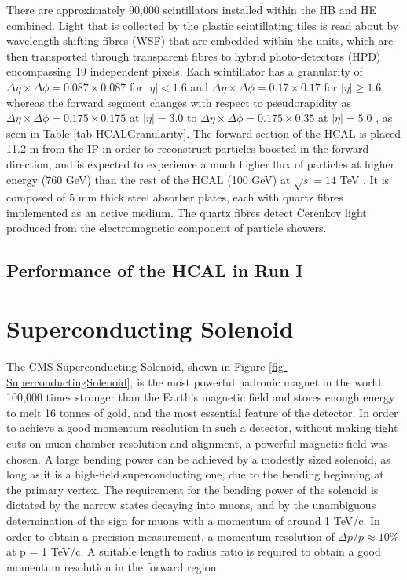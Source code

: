 There are approximately 90,000 scintillators installed within the HB and HE combined. Light that is collected by the plastic scintillating tiles is read about by wavelength-shifting fibres (WSF) that are embedded within the units, which are then transported through transparent fibres to hybrid photo-detectors (HPD) encompassing 19 independent pixels. Each scintillator has a granularity of $\Delta \eta \times \Delta \phi = 0.087 \times 0.087$ for $|\eta|<1.6$ and $\Delta \eta \times \Delta \phi = 0.17 \times 0.17$ for $|\eta| \ge 1.6$, whereas the forward segment changes with respect to pseudorapidity as $\Delta \eta \times \Delta \phi = 0.175 \times 0.175$ at $|\eta| = 3.0$ to $\Delta \eta \times \Delta \phi = 0.175 \times 0.35$ at $|\eta| = 5.0$ \cite{HCALTdr}, as seen in Table \ref{tab-HCALGranularity}. The forward section of the HCAL is placed 11.2 m from the IP in order to reconstruct particles boosted in the forward direction, and is expected to experience a much higher flux of particles at higher energy (760 GeV) than the rest of the HCAL (100 GeV) at $\sqrt{s}=14$ TeV \cite{HCALUpgradeTdr}. It is composed of 5 mm thick steel absorber plates, each with quartz fibres implemented as an active medium. The quartz fibres detect \v{C}erenkov light produced from the electromagnetic component of particle showers.

\subsection{Performance of the HCAL in Run I}   



\section{Superconducting Solenoid} \label{sec-SuperconductingSolenoid}

The CMS Superconducting Solenoid, shown in Figure \ref{fig-SuperconductingSolenoid}, is the most powerful hadronic magnet in the world, 100,000 times stronger than the Earth's magnetic field and stores enough energy to melt 16 tonnes of gold, and the most essential feature of the detector. In order to achieve a good momentum resolution in such a detector, without making tight cuts on muon chamber resolution and alignment, a powerful magnetic field was chosen. A large bending power can be achieved by a modestly sized solenoid, as long as it is a high-field superconducting one, due to the bending beginning at the primary vertex. The requirement for the bending power of the solenoid is dictated by the narrow states decaying into muons, and by the unambiguous determination of the sign for muons with a momentum of around 1 TeV/c. In order to obtain a precision measurement, a momentum resolution of $\Delta p/p\approx10\%$ at p = 1 TeV/c. A suitable length to radius ratio is required to obtain a good momentum resolution in the forward region.  

